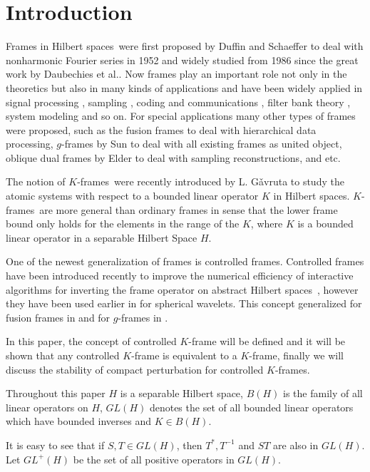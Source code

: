 \documentclass[11pt]{amsart}
\theoremstyle{definition}
\theoremstyle{remark}
\numberwithin{equation}{section}
\begin{document}
\section{Introduction}
Frames in {Hilbert spaces}\ were first proposed by Duffin and Schaeffer to deal with nonharmonic Fourier series in 1952 \cite{Duff} and widely studied from 1986 since the great work by Daubechies et al.\cite{Daub}.
Now frames play an important role not only in the theoretics but also in many kinds of applications and have been widely applied in signal processing \cite{Ferr}, sampling \cite{Eldar1,Eldar2}, coding and communications \cite{strh}, filter bank theory \cite{Bolcskei}, system modeling \cite{Duday} and so on.
For special applications many other types of frames were proposed, such as the fusion frames \cite{Casazza1,Casazza2} to deal with hierarchical data processing, $g$-frames \cite{sun} by Sun to deal with all existing frames as united object, oblique dual frames \cite{Eldar1} by Elder to deal with sampling reconstructions, and etc. \par
The notion of
{$K$-frames}\    were recently introduced by L. G\v{a}vruta to study the atomic systems with respect to a bounded linear operator $K$ in {Hilbert spaces}. {$K$-frames}\   are more general than ordinary frames in sense that the lower frame bound only holds for the elements in the range of the  $K$, where $K$ is a bounded linear operator in a separable Hilbert Space $H$.\par
One of the newest generalization of frames is controlled frames. Controlled frames have been introduced recently to improve the numerical efficiency of interactive algorithms for inverting the frame operator on abstract {Hilbert spaces}\ \cite{Balazs}, however they have been used earlier in \cite{Bogdanova} for spherical wavelets. This concept generalized for fusion frames in \cite{khos} and for $g$-frames in \cite{Rahimi}.

In this paper, the concept of controlled $K$-frame will be defined and it will be shown that any controlled $K$-frame is equivalent to a $K$-frame, finally we will discuss the stability of compact perturbation for controlled $K$-frames.

Throughout this paper $H$ is a separable Hilbert space, $B(H)$ is the family of all linear operators on $H$, $GL(H)$ denotes the set of all bounded linear operators which have bounded inverses and $K\in B(H)$.

It is easy to see that if $S,T\in GL(H)$, then $T^*,T^{-1}$ and $ST$ are also in $GL(H)$. Let $GL^+(H)$ be the set of all positive operators in $GL(H)$.
\end{document}
